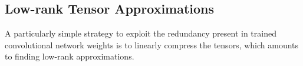 %
%


\subsection{Low-rank Tensor Approximations}\label{subsec:low_rank}

A particularly simple strategy to exploit the redundancy present in trained convolutional network weights is to 
linearly compress the tensors, which amounts to finding low-rank approximations. 


